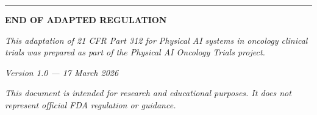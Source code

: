 \vspace{1cm}

\noindent\rule{\textwidth}{0.4pt}

\vspace{0.5cm}

\begin{center}
\textbf{END OF ADAPTED REGULATION}

\vspace{0.3cm}

\textit{This adaptation of 21 CFR Part 312 for Physical AI systems in oncology clinical trials was prepared as part of the Physical AI Oncology Trials project.}

\vspace{0.2cm}

\textit{Version 1.0 --- 17 March 2026}

\vspace{0.2cm}

\textit{This document is intended for research and educational purposes. It does not represent official FDA regulation or guidance.}
\end{center}


